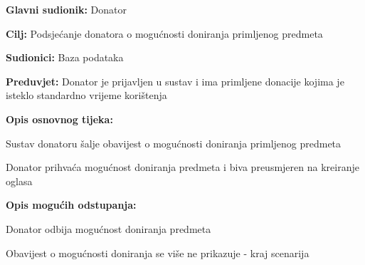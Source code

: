 					\noindent {}
					\begin{packed_item}
	
						\item \textbf{Glavni sudionik: }Donator
						\item  \textbf{Cilj:} Podsjećanje donatora o mogućnosti doniranja primljenog predmeta
						\item  \textbf{Sudionici:} Baza podataka
						\item  \textbf{Preduvjet:} Donator je prijavljen u sustav i ima primljene donacije kojima je isteklo standardno vrijeme korištenja
						\item  \textbf{Opis osnovnog tijeka:}
						
						\item[] \begin{packed_enum}
							\item Sustav donatoru šalje obavijest o mogućnosti doniranja primljenog predmeta
							\item Donator prihvaća mogućnost doniranja predmeta i biva preusmjeren na kreiranje oglasa
						\end{packed_enum}

						\item  \textbf{Opis mogućih odstupanja:}

						\item[] \begin{packed_item}
							\item[2.a] Donator odbija mogućnost doniranja predmeta
							\item[] \begin{packed_enum}
								
								\item Obavijest o mogućnosti doniranja se više ne prikazuje - kraj scenarija
							
							\end{packed_enum}	
						\end{packed_item}
					\end{packed_item}

					\eject

